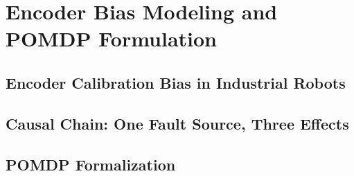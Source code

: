 
\chapter{Encoder Bias Modeling and POMDP Formulation}\label{ch:problem_formulation}

\section{Encoder Calibration Bias in Industrial Robots}\label{sec:bias_sources}

%

\section{Causal Chain: One Fault Source, Three Effects}\label{sec:causal_chain}

%
%
%
%
%

\section{POMDP Formalization}\label{sec:pomdp}

%
%
%

